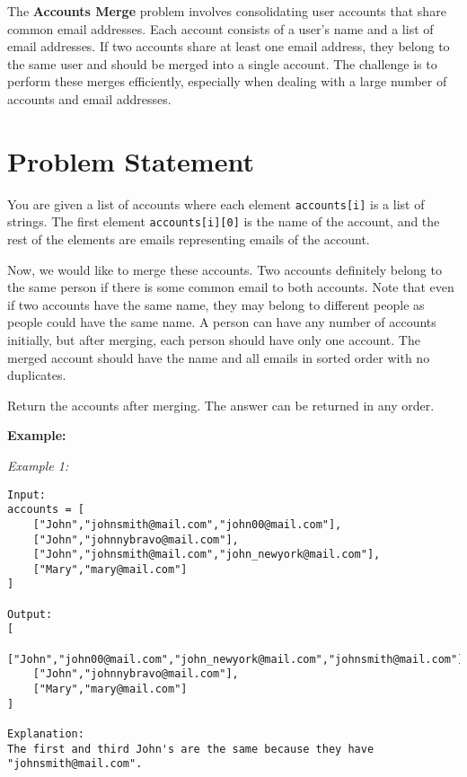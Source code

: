 
\label{problem:accounts_merge}

The \textbf{Accounts Merge} problem involves consolidating user accounts that share common email addresses. Each account consists of a user's name and a list of email addresses. If two accounts share at least one email address, they belong to the same user and should be merged into a single account. The challenge is to perform these merges efficiently, especially when dealing with a large number of accounts and email addresses.

\section*{Problem Statement}

You are given a list of accounts where each element \texttt{accounts[i]} is a list of strings. The first element \texttt{accounts[i][0]} is the name of the account, and the rest of the elements are emails representing emails of the account.

Now, we would like to merge these accounts. Two accounts definitely belong to the same person if there is some common email to both accounts. Note that even if two accounts have the same name, they may belong to different people as people could have the same name. A person can have any number of accounts initially, but after merging, each person should have only one account. The merged account should have the name and all emails in sorted order with no duplicates.

Return the accounts after merging. The answer can be returned in any order.

\textbf{Example:}

\textit{Example 1:}

\begin{verbatim}
Input:
accounts = [
    ["John","johnsmith@mail.com","john00@mail.com"],
    ["John","johnnybravo@mail.com"],
    ["John","johnsmith@mail.com","john_newyork@mail.com"],
    ["Mary","mary@mail.com"]
]

Output:
[
    ["John","john00@mail.com","john_newyork@mail.com","johnsmith@mail.com"],
    ["John","johnnybravo@mail.com"],
    ["Mary","mary@mail.com"]
]

Explanation:
The first and third John's are the same because they have "johnsmith@mail.com".
\end{verbatim}

